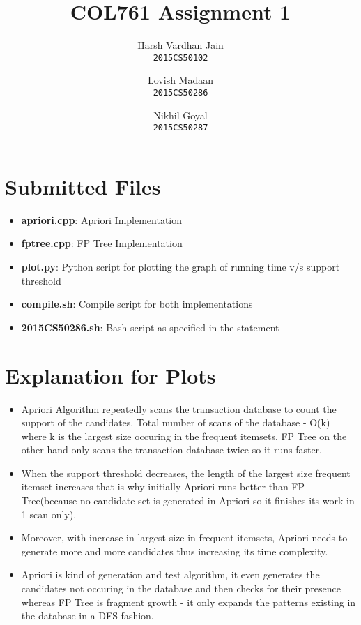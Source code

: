 \documentclass{article}
\title{COL761 Assignment 1}
\author{Harsh Vardhan Jain \\ \texttt{2015CS50102} \and Lovish Madaan \\ \texttt{2015CS50286} \and Nikhil Goyal \\ \texttt{2015CS50287}}
\begin{document}
\maketitle
\section{Submitted Files}
\begin{itemize}
    \item \textbf{apriori.cpp}: Apriori Implementation
    \item \textbf{fptree.cpp}: FP Tree Implementation
    \item \textbf{plot.py}: Python script for plotting the graph of running time v/s support threshold
    \item \textbf{compile.sh}: Compile script for both implementations
    \item \textbf{2015CS50286.sh}: Bash script as specified in the statement
\end{itemize}

\section{Explanation for Plots}
\begin{itemize}
    \item Apriori Algorithm repeatedly scans the transaction database to count the support of the candidates. Total number of scans of the database - O(k) where k is the largest size occuring in the frequent itemsets. FP Tree on the other hand only scans the transaction database twice so it runs faster.
    \item When the support threshold decreases, the length of the largest size frequent itemset increases that is why initially Apriori runs better than FP Tree(because no candidate set is generated in Apriori so it finishes its work in 1 scan only).
    \item Moreover, with increase in largest size in frequent itemsets, Apriori needs to generate more and more candidates thus increasing its time complexity.
    \item Apriori is kind of generation and test algorithm, it even generates the candidates not occuring in the database and then checks for their presence whereas FP Tree is fragment growth - it only expands the patterns existing in the database in a DFS fashion.
\end{itemize}
\end{document}
